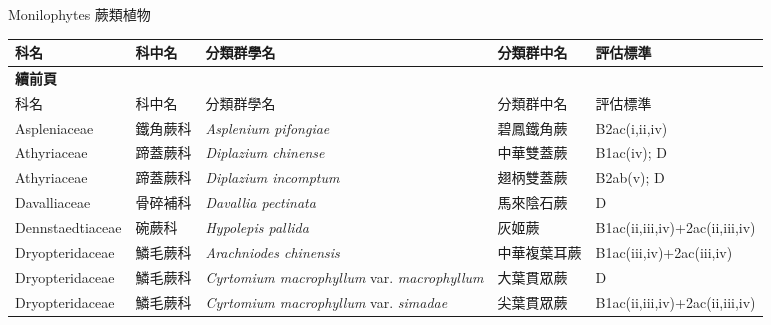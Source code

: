 \noindent\normalfont\selectfont Monilophytes 蕨類植物
\footnotesize\selectfont
        {\def\arraystretch{1.5}\tabcolsep=2pt
        \begin{longtable}{p{2.5cm}p{2.5cm}p{4.5cm}p{2.5cm}p{3cm}}
        \toprule
          科名 & 科中名 & 分類群學名 & 分類群中名 & 評估標準 \\
        \midrule 
        \endfirsthead

        {{\bfseries 續前頁 }} \\
        科名 & 科中名 & 分類群學名 & 分類群中名 & 評估標準 \\
        \midrule
        \endhead
                Aspleniaceae & 鐵角蕨科 & \textit{Asplenium pifongiae}  & 碧鳳鐵角蕨 & B2ac(i,ii,iv) \index{Asplenium@\textit{Asplenium}!pifongiae@\textit{pifongiae}}  \index{碧鳳鐵角蕨} \\
    Athyriaceae & 蹄蓋蕨科 & \textit{Diplazium chinense}  & 中華雙蓋蕨 & B1ac(iv); D \index{Diplazium@\textit{Diplazium}!chinense@\textit{chinense}}  \index{中華雙蓋蕨} \\
    Athyriaceae & 蹄蓋蕨科 & \textit{Diplazium incomptum}  & 翅柄雙蓋蕨 & B2ab(v); D \index{Diplazium@\textit{Diplazium}!incomptum@\textit{incomptum}}  \index{翅柄雙蓋蕨} \\
    Davalliaceae & 骨碎補科 & \textit{Davallia pectinata}  & 馬來陰石蕨 & D \index{Davallia@\textit{Davallia}!pectinata@\textit{pectinata}}  \index{馬來陰石蕨} \\
    Dennstaedtiaceae & 碗蕨科 & \textit{Hypolepis pallida}  & 灰姬蕨 & B1ac(ii,iii,iv)+2ac(ii,iii,iv) \index{Hypolepis@\textit{Hypolepis}!pallida@\textit{pallida}}  \index{灰姬蕨} \\
    Dryopteridaceae & 鱗毛蕨科 & \textit{Arachniodes chinensis}  & 中華複葉耳蕨 & B1ac(iii,iv)+2ac(iii,iv) \index{Arachniodes@\textit{Arachniodes}!chinensis@\textit{chinensis}}  \index{中華複葉耳蕨} \\
    Dryopteridaceae & 鱗毛蕨科 & \textit{Cyrtomium macrophyllum} var. \textit{macrophyllum}  & 大葉貫眾蕨 & D \index{Cyrtomium@\textit{Cyrtomium}!macrophyllum@\textit{macrophyllum}!var. macrophyllum@var. \textit{macrophyllum}}  \index{大葉貫眾蕨} \\
    Dryopteridaceae & 鱗毛蕨科 & \textit{Cyrtomium macrophyllum} var. \textit{simadae}  & 尖葉貫眾蕨 & B1ac(ii,iii,iv)+2ac(ii,iii,iv) \index{Cyrtomium@\textit{Cyrtomium}!macrophyllum@\textit{macrophyllum}!var. simadae@var. \textit{simadae}}  \index{尖葉貫眾蕨} \\

\end{longtable}}
